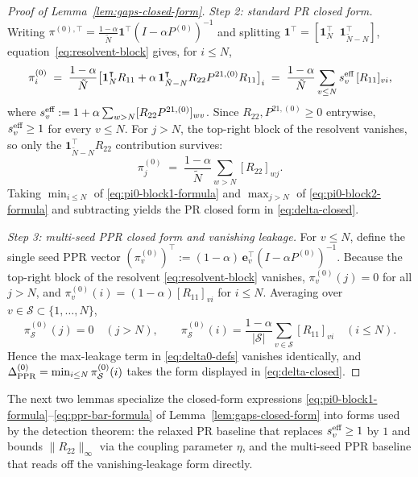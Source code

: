 \documentclass{article}
\theoremstyle{plain}
\theoremstyle{definition}
\def\tp{\intercal}
\newcommand{\arXivtag}[1][]{#1}
\begin{document}
\begin{proof}[Proof of Lemma~\ref{lem:gaps-closed-form}]
	\emph{Step 2: standard PR closed form.} Writing ${\pi}^{(0),\tp} = \tfrac{1-\alpha}{\tilde{N}}\mathbf{1}^\tp(I-\alpha P^{(0)})^{-1}$ and splitting $\mathbf{1}^\tp = [\mathbf{1}_N^\tp\;\;\mathbf{1}_{\tilde N - N}^\tp]$, equation~\eqref{eq:resolvent-block} gives, for $i \leq N$,
	\begin{equation}\label{eq:pi0-block1-formula}
		\pi_i^{(0)} \;=\; \frac{1-\alpha}{\tilde{N}}\bigl[\mathbf{1}_N^\tp R_{11} + \alpha\,\mathbf{1}_{\tilde N - N}^\tp R_{22}P^{21,(0)}R_{11}\bigr]_i \;=\; \frac{1-\alpha}{\tilde{N}}\sum_{v \leq N} s_v^{\textnormal{eff}}\,[R_{11}]_{vi},
	\end{equation}
	where $s_v^{\textnormal{eff}} := 1 + \alpha\sum_{w > N}[R_{22}P^{21,(0)}]_{wv}$. Since $R_{22},P^{21,(0)} \geq 0$ entrywise, $s_v^{\textnormal{eff}} \geq 1$ for every $v \leq N$. For $j > N$, the top-right block of the resolvent vanishes, so only the $\mathbf{1}_{\tilde N - N}^\tp R_{22}$ contribution survives:
	\begin{equation}\label{eq:pi0-block2-formula}
		\pi_j^{(0)} \;=\; \frac{1-\alpha}{\tilde{N}}\sum_{w > N}[R_{22}]_{wj}.
	\end{equation}
	Taking $\min_{i \leq N}$ of \eqref{eq:pi0-block1-formula} and $\max_{j > N}$ of \eqref{eq:pi0-block2-formula} and subtracting yields the PR closed form in \eqref{eq:delta-closed}.
	
	
		\emph{Step 3: multi-seed PPR closed form and vanishing leakage.} For $v \leq N$, define the single seed PPR vector $(\pi_v^{(0)})^\tp := (1-\alpha)\,\mathbf{e}_v^\tp(I-\alpha P^{(0)})^{-1}$. Because the top-right block of the resolvent \eqref{eq:resolvent-block} vanishes, $\pi_v^{(0)}(j) = 0$ for all $j > N$, and $\pi_v^{(0)}(i) = (1-\alpha)[R_{11}]_{vi}$ for $i \leq N$. Averaging over $v \in \mathcal{S} \subset \{1,\ldots,N\}$,
		\begin{equation}\label{eq:ppr-bar-formula}
			\pi_{\mathcal{S}}^{(0)}(j) = 0 \quad (j > N), \qquad \pi_{\mathcal{S}}^{(0)}(i) = \frac{1-\alpha}{|\mathcal{S}|}\sum_{v \in \mathcal{S}}[R_{11}]_{vi} \quad (i \leq N).
		\end{equation}
		Hence the max-leakage term in \eqref{eq:delta0-defs} vanishes identically, and $\Delta^{(0)}_{\textnormal{PPR}} = \min_{i\leq N}\pi_{\mathcal{S}}^{(0)}(i)$ takes the form displayed in \eqref{eq:delta-closed}.
	
	
\end{proof}

The next two lemmas specialize the closed-form expressions \arXivtag[\eqref{eq:pi0-block1-formula}--\eqref{eq:ppr-bar-formula}] of Lemma~\ref{lem:gaps-closed-form} into forms used by the detection theorem: the relaxed PR baseline that replaces $s_v^{\textnormal{eff}} \geq 1$ by $1$ and bounds $\|R_{22}\|_\infty$ via the coupling parameter $\eta$, and the multi-seed PPR baseline that reads off the vanishing-leakage form directly.
\end{document}
